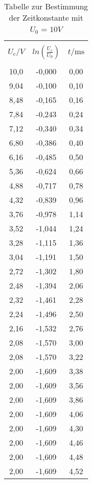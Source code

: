 \begin{table}[H]
  \centering
  \caption{Tabelle zur Bestimmung der Zeitkonstante mit $U_\text{0}$ = $10V$}
    \begin{tabular}{c c c }
      \toprule \\
      $U_\text{c} / V$& $ln(\frac{U_\text{c}}{U_\text{0}})$ & $t /\si{\milli\second}$ \\
      \midrule \\
      10,0& -0,000 & 0,00 \\
      9,04& -0,100 & 0,10 \\
      8,48& -0,165 & 0,16 \\
      7,84& -0,243 & 0,24 \\
      7,12& -0,340 & 0,34 \\
      6,80& -0,386 & 0,40 \\
      6,16& -0,485 & 0,50 \\
      5,36& -0,624 & 0,66 \\
      4,88& -0,717 & 0,78 \\
      4,32& -0,839 & 0,96 \\
      3,76& -0,978 & 1,14 \\
      3,52& -1,044 & 1,24 \\
      3,28& -1,115 & 1,36 \\
      3,04& -1,191 & 1,50 \\
      2,72& -1,302 & 1,80 \\
      2,48& -1,394 & 2,06 \\
      2,32& -1,461 & 2,28 \\
      2,24& -1,496 & 2,50 \\
      2,16& -1,532 & 2,76 \\
      2,08& -1,570 & 3,00 \\
      2,08& -1,570 & 3,22 \\
      2,00& -1,609 & 3,38 \\
      2,00& -1,609 & 3,56 \\
      2,00& -1,609 & 3,86 \\
      2,00& -1,609 & 4,06 \\
      2,00& -1,609 & 4,30 \\
      2,00& -1,609 & 4,46 \\
      2,00& -1,609 & 4,48 \\
      2,00& -1,609 & 4,52 \\
      \bottomrule
    \end{tabular}
    \label{tab:1}
  \end{table}
